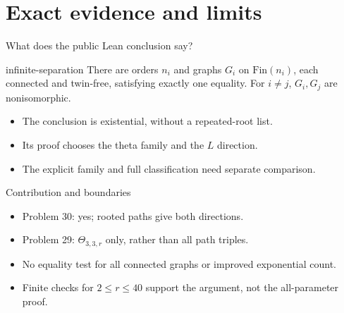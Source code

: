 \documentclass{beamer}
\begin{document}
\section{Exact evidence and limits}
\begin{frame}{What does the public Lean conclusion say?}
\begin{bookresult}{infinite-separation}
There are orders $n_i$ and graphs $G_i$ on $\mathrm{Fin}(n_i)$, each connected and twin-free, satisfying exactly one equality. For $i\ne j$, $G_i,G_j$ are nonisomorphic.
\end{bookresult}
\begin{itemize}
\item The conclusion is existential, without a repeated-root list.
\item Its proof chooses the theta family and the $L$ direction.
\item The explicit family and full classification need separate comparison.
\end{itemize}
\end{frame}
\begin{frame}{Contribution and boundaries}
\begin{itemize}
\item Problem 30: yes; rooted paths give both directions.
\item Problem 29: $\Theta_{3,3,r}$ only, rather than all path triples.
\item No equality test for all connected graphs or improved exponential count.
\item Finite checks for $2\leq r\leq40$ support the argument, not the all-parameter proof.
\end{itemize}
\end{frame}
\end{document}
